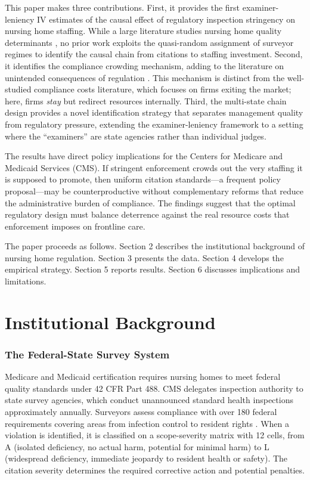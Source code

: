 \documentclass[12pt]{article}
\begin{document}
This paper makes three contributions. First, it provides the first examiner-leniency IV estimates of the causal effect of regulatory inspection stringency on nursing home staffing. While a large literature studies nursing home quality determinants \citep{Grabowski2004, Bowblis2011, Konetzka2014}, no prior work exploits the quasi-random assignment of surveyor regimes to identify the causal chain from citations to staffing investment. Second, it identifies the compliance crowding mechanism, adding to the literature on unintended consequences of regulation \citep{Bardach2000, ShortToffel2010, Parker2013, Johnson2020}. This mechanism is distinct from the well-studied compliance costs literature, which focuses on firms exiting the market; here, firms \textit{stay} but redirect resources internally. Third, the multi-state chain design provides a novel identification strategy that separates management quality from regulatory pressure, extending the examiner-leniency framework to a setting where the ``examiners'' are state agencies rather than individual judges.

The results have direct policy implications for the Centers for Medicare and Medicaid Services (CMS). If stringent enforcement crowds out the very staffing it is supposed to promote, then uniform citation standards---a frequent policy proposal---may be counterproductive without complementary reforms that reduce the administrative burden of compliance. The findings suggest that the optimal regulatory design must balance deterrence against the real resource costs that enforcement imposes on frontline care.

The paper proceeds as follows. Section 2 describes the institutional background of nursing home regulation. Section 3 presents the data. Section 4 develops the empirical strategy. Section 5 reports results. Section 6 discusses implications and limitations.

\section{Institutional Background}

\subsubsection*{The Federal-State Survey System} Medicare and Medicaid certification requires nursing homes to meet federal quality standards under 42 CFR Part 488. CMS delegates inspection authority to state survey agencies, which conduct unannounced standard health inspections approximately annually. Surveyors assess compliance with over 180 federal requirements covering areas from infection control to resident rights \citep{CMS2017}. When a violation is identified, it is classified on a scope-severity matrix with 12 cells, from A (isolated deficiency, no actual harm, potential for minimal harm) to L (widespread deficiency, immediate jeopardy to resident health or safety). The citation severity determines the required corrective action and potential penalties.
\end{document}
